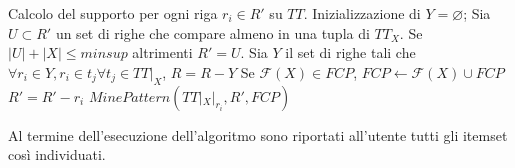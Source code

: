 \begin{algorithm}[H]
\caption{\(MinePattern(TT|_{X}, R', FCP)\)}\label{alg:minepattern}
\begin{algorithmic}[1]
\State Calcolo del supporto per ogni riga \(r_{i} \in R'\) su \(TT\). Inizializzazione di \(Y = \varnothing\); 
\State  Sia \(U \subset R'\) un set di righe che compare almeno in una tupla di \(TT_{X}\). Se \(|U| + |X| \leq minsup\) \Return altrimenti \(R' = U\). 
\State  Sia \(Y\) il set di righe tali che \(\forall r_{i} \in Y, r_{i} \in t_{j} \forall t_{j} \in TT|_{X}\), \(R = R - Y\) 
\State  Se \(\mathcal{F}(X) \in FCP\), \Return {}
   
     \State \(FCP \gets \mathcal{F}(X) \cup FCP\)  
  \EndIf
  
        \State $R' = R' - {r_i}$ 
        \State $MinePattern(TT|_{X}|_{r_{i}}, R', FCP)$ 
    \EndFor
\end{algorithmic}
\end{algorithm}

Al termine dell'esecuzione dell'algoritmo sono riportati all'utente tutti gli itemset così individuati.
